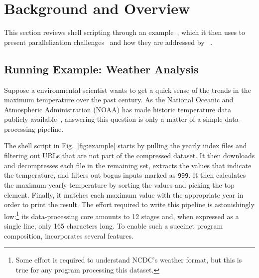 \documentclass[letterpaper,twocolumn,10pt]{article}
\newcommand{\ttt}[1]{\texttt{#1}}
\begin{document}

\section{Background and Overview}
\label{bg}

This section reviews shell scripting through an example~, which it then uses to present 
parallelization challenges~ and how they are addressed by \sys~.

\subsection{Running Example: Weather Analysis}
\label{bg:pipelines}

Suppose a environmental scientist    %
  wants to get a quick sense of the trends in the maximum temperature over the past century.
As the National Oceanic and Atmospheric Administration (NOAA) has made historic temperature data publicly available~\cite{noaa}, 
  answering this question is only a matter of a simple data-processing pipeline.

The shell script in Fig.~\ref{fig:example} starts by pulling the yearly index files and filtering out URLs that are not part of the compressed dataset.
It then downloads and decompresses each file in the remaining set, extracts the values that indicate the temperature, and filters out bogus inputs marked as \ttt{999}.
It then calculates the maximum yearly temperature by sorting the values and picking the top element.
Finally, it matches each maximum value with the appropriate year in order to print the result.
% 
The effort required to write this pipeline is astonishingly low:\footnote{
  Some effort is required to understand NCDC's weather format, but this is true for any program processing this dataset.
}
  its data-processing core amounts to 12 stages and, when expressed as a single line, only 165 characters long.
To enable such a succinct program composition, \unix incorporates several features.
\end{document}
